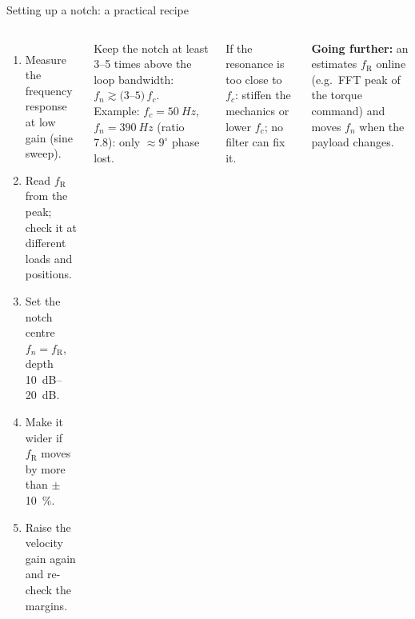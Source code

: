 \documentclass[aspectratio=169,10pt]{beamer}
\newcommand{\gofurther}[1]{{\footnotesize\color{mkGray}\textbf{\color{mkMid}Going further:} #1}}
\begin{document}
\begin{frame}{Setting up a notch: a practical recipe}
\begin{columns}[T]
\begin{enumerate}\small
\item Measure the frequency response at low gain (sine sweep).
\item Read $f_\text{R}$ from the peak; check it at different loads and positions.
\item Set the notch centre $f_n=f_\text{R}$, depth \SIrange{10}{20}{dB}.
\item Make it wider if $f_\text{R}$ moves by more than $\pm$\SI{10}{\%}.
\item Raise the velocity gain again and re-check the margins.
\end{enumerate}
\begin{keybox}
\small Keep the notch at least 3--5 times above the loop bandwidth: $f_n\gtrsim(3$--$5)\,f_c$. Example: $f_c=\SI{50}{Hz}$, $f_n=\SI{390}{Hz}$ (ratio 7.8): only $\approx 9^\circ$ phase lost.
\end{keybox}
\begin{notebox}
\small If the resonance is too close to $f_c$: stiffen the mechanics or lower $f_c$; no filter can fix it.
\end{notebox}
\gofurther{an  estimates $f_\text{R}$ online (e.g.\ FFT peak of the torque command) and moves $f_n$ when the payload changes.}
\end{columns}
\end{frame}
\end{document}
